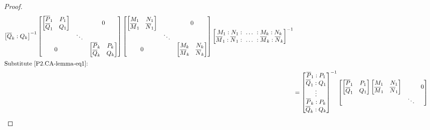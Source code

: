 \documentclass[10pt,reqno,oneside,a4paper]{article}
\begin{document}
\begin{proof}
\begin{align}
\begin{bmatrix}
\overline{Q}_k : Q_k 
\end{bmatrix}^{-1}
\begin{bmatrix}
\begin{bmatrix}
\overline{P}_1 & P_1 \\
\overline{Q}_1 & Q_1 
\end{bmatrix} 
 & & 0 \\
 & \ddots & \\
0 & & \begin{bmatrix}
\overline{P}_k & P_k \\
\overline{Q}_k & Q_k 
\end{bmatrix} 
\end{bmatrix}  
\begin{bmatrix}
\begin{bmatrix}
M_1 & N_1  \\
\overline{M}_1 & \overline{N}_1 
\end{bmatrix} & & 0 \\
 & \ddots & \\
0 & & 
\begin{bmatrix}
M_k & N_k  \\
\overline{M}_k & \overline{N}_k 
\end{bmatrix}
\end{bmatrix}
\begin{bmatrix}
M_1 : N_1 :~ \ldots ~: M_k : N_k \\
\overline{M}_1 : \overline{N}_1 :~ \ldots ~: \overline{M}_k : \overline{N}_k 
\end{bmatrix}^{-1} \nonumber \\
\intertext{Substitute \eqref{P2.CA-lemma-eq1}:}
&= \begin{bmatrix}
\overline{P}_1 : P_1 \\
\overline{Q}_1 : Q_1 \\
\vdots \\
\overline{P}_k : P_k \\
\overline{Q}_k : Q_k 
\end{bmatrix}^{-1}
\begin{bmatrix}
\begin{bmatrix}
\overline{P}_1 & P_1 \\
\overline{Q}_1 & Q_1 
\end{bmatrix} 
\begin{bmatrix}
M_1 & N_1  \\
\overline{M}_1 & \overline{N}_1 
\end{bmatrix} & & 0 \\
 & \ddots & \\

\end{bmatrix}
\end{align}
\end{proof}
\end{document}
